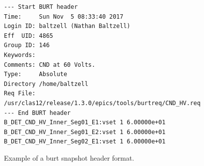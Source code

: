 \documentclass[amsmath,amssymb,notitlepage,11pt]{revtex4}
\begin{document}
\begin{appendices}
\begin{figure}[htbp]\centering
\begin{verbatim}
--- Start BURT header
Time:     Sun Nov  5 08:33:40 2017
Login ID: baltzell (Nathan Baltzell)
Eff  UID: 4865
Group ID: 146
Keywords: 
Comments: CND at 60 Volts. 
Type:     Absolute
Directory /home/baltzell
Req File: /usr/clas12/release/1.3.0/epics/tools/burtreq/CND_HV.req
--- End BURT header
B_DET_CND_HV_Inner_Seg01_E1:vset 1 6.00000e+01
B_DET_CND_HV_Inner_Seg01_E2:vset 1 6.00000e+01
B_DET_CND_HV_Inner_Seg02_E1:vset 1 6.00000e+01
\end{verbatim}
    \caption{Example of a burt snapshot header format.\label{fig:burt3}}
\end{figure}

\end{appendices}

%
\end{document}
